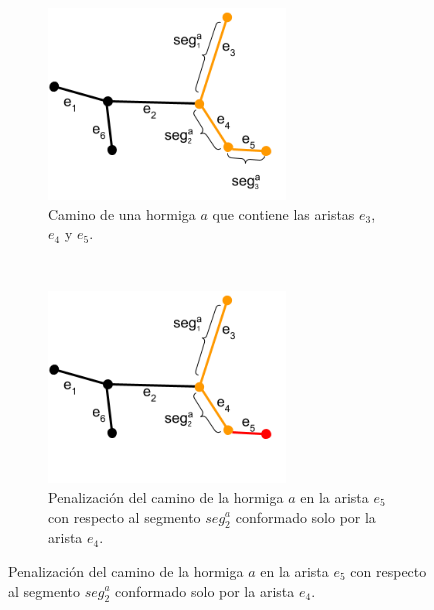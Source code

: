 \clearpage




 \begin{figure}[t]
    \centering
    \begin{subfigure}[t]{0.48\textwidth}
        \centering
        \includegraphics[height=2in]{imagenes/ant_segments_complex_case_B1.png}
        \caption{Camino de una hormiga $a$ que contiene las aristas $e_3$, $e_4$ y $e_5$.}
        \label{fig:segmentComplexCaseB1}
    \end{subfigure}%
    ~ \hspace{0.5cm}
    \begin{subfigure}[t]{0.48\textwidth}
        \centering
        \includegraphics[height=2in]{imagenes/ant_segments_complex_case_B2.png}
        \caption{Penalizaci\'on del camino de la hormiga $a$ en la arista $e_5$ con respecto al segmento $seg^{a}_2$ conformado solo por la arista $e_4$.}
        \label{fig:segmentComplexCaseB2}
    \end{subfigure}


\end{figure}
